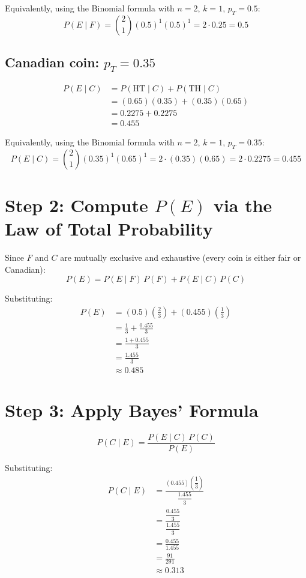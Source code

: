 \documentclass[12pt]{article}
\begin{document}
Equivalently, using the Binomial formula with $n=2$, $k=1$, $p_T = 0.5$:
\[
P(E \mid F) = \binom{2}{1}(0.5)^1(0.5)^1 = 2 \cdot 0.25 = 0.5
\]

\subsection*{Canadian coin: $p_T = 0.35$}

\begin{align*}
P(E \mid C)
&= P(\text{HT} \mid C) + P(\text{TH} \mid C) \\
&= (0.65)(0.35) + (0.35)(0.65) \\
&= 0.2275 + 0.2275 \\
&= \boxed{0.455}
\end{align*}

Equivalently, using the Binomial formula with $n=2$, $k=1$, $p_T = 0.35$:
\[
P(E \mid C) = \binom{2}{1}(0.35)^1(0.65)^1 = 2 \cdot (0.35)(0.65) = 2 \cdot 0.2275 = 0.455
\]

\section*{Step 2: Compute $P(E)$ via the Law of Total Probability}

Since $F$ and $C$ are mutually exclusive and exhaustive (every coin is either fair
or Canadian):
\[
P(E) = P(E \mid F)\,P(F) + P(E \mid C)\,P(C)
\]

Substituting:
\begin{align*}
P(E) &= (0.5)\!\left(\frac{2}{3}\right) + (0.455)\!\left(\frac{1}{3}\right) \\[6pt]
     &= \frac{1}{3} + \frac{0.455}{3} \\[6pt]
     &= \frac{1 + 0.455}{3} \\[6pt]
     &= \frac{1.455}{3} \\[6pt]
     &\approx 0.485
\end{align*}

\section*{Step 3: Apply Bayes' Formula}

\[
P(C \mid E) = \frac{P(E \mid C)\,P(C)}{P(E)}
\]

Substituting:
\begin{align*}
P(C \mid E)
&= \frac{(0.455)\!\left(\dfrac{1}{3}\right)}{\dfrac{1.455}{3}} \\[10pt]
&= \frac{\dfrac{0.455}{3}}{\dfrac{1.455}{3}} \\[10pt]
&= \frac{0.455}{1.455} \\[6pt]
&= \frac{91}{291} \\[6pt]
&\approx \boxed{0.313}
\end{align*}
\end{document}
